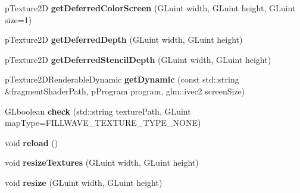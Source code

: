 \begin{DoxyCompactItemize}
\item 
\hypertarget{classfillwave_1_1manager_1_1TextureManager_a70b8f4eea4d9581b729fe719ba0eb051}{}p\+Texture2\+D {\bfseries get\+Deferred\+Color\+Screen} (G\+Luint width, G\+Luint height, G\+Luint size=1)\label{classfillwave_1_1manager_1_1TextureManager_a70b8f4eea4d9581b729fe719ba0eb051}

\item 
\hypertarget{classfillwave_1_1manager_1_1TextureManager_a6268124bb3f4c9e2d36a1a9d67fe6a0b}{}p\+Texture2\+D {\bfseries get\+Deferred\+Depth} (G\+Luint width, G\+Luint height)\label{classfillwave_1_1manager_1_1TextureManager_a6268124bb3f4c9e2d36a1a9d67fe6a0b}

\item 
\hypertarget{classfillwave_1_1manager_1_1TextureManager_a015dc2fd80bb933d0edd820bab853d06}{}p\+Texture2\+D {\bfseries get\+Deferred\+Stencil\+Depth} (G\+Luint width, G\+Luint height)\label{classfillwave_1_1manager_1_1TextureManager_a015dc2fd80bb933d0edd820bab853d06}

\item 
\hypertarget{classfillwave_1_1manager_1_1TextureManager_a9e4a6ecb64d5f9dd28414e9c8fe62d06}{}p\+Texture2\+D\+Renderable\+Dynamic {\bfseries get\+Dynamic} (const std\+::string \&fragment\+Shader\+Path, p\+Program program, glm\+::ivec2 screen\+Size)\label{classfillwave_1_1manager_1_1TextureManager_a9e4a6ecb64d5f9dd28414e9c8fe62d06}

\item 
\hypertarget{classfillwave_1_1manager_1_1TextureManager_a29f3d2bc108af5de03d3c74e23fab814}{}G\+Lboolean {\bfseries check} (std\+::string texture\+Path, G\+Luint map\+Type=F\+I\+L\+L\+W\+A\+V\+E\+\_\+\+T\+E\+X\+T\+U\+R\+E\+\_\+\+T\+Y\+P\+E\+\_\+\+N\+O\+N\+E)\label{classfillwave_1_1manager_1_1TextureManager_a29f3d2bc108af5de03d3c74e23fab814}

\item 
\hypertarget{classfillwave_1_1manager_1_1TextureManager_a26599576d6340b67b57e580d96d4ad2c}{}void {\bfseries reload} ()\label{classfillwave_1_1manager_1_1TextureManager_a26599576d6340b67b57e580d96d4ad2c}

\item 
\hypertarget{classfillwave_1_1manager_1_1TextureManager_a33918d6cd7e4b8d7bf152c5ae46aede5}{}void {\bfseries resize\+Textures} (G\+Luint width, G\+Luint height)\label{classfillwave_1_1manager_1_1TextureManager_a33918d6cd7e4b8d7bf152c5ae46aede5}

\item 
\hypertarget{classfillwave_1_1manager_1_1TextureManager_a34a7683620dc1d60fdd8a5523d28447d}{}void {\bfseries resize} (G\+Luint width, G\+Luint height)\label{classfillwave_1_1manager_1_1TextureManager_a34a7683620dc1d60fdd8a5523d28447d}

\end{DoxyCompactItemize}


